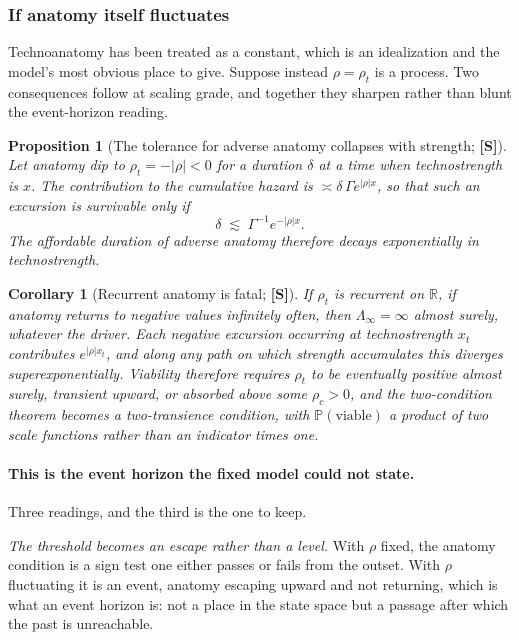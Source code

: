 \documentclass[11pt]{article}
\numberwithin{equation}{section}
\theoremstyle{plain}
\newtheorem{proposition}[theorem]{Proposition}
\newtheorem{corollary}[theorem]{Corollary}
\theoremstyle{definition}
\theoremstyle{remark}
\newcommand{\PP}{\mathbb{P}}
\newcommand{\R}{\mathbb{R}}
\begin{document}
\subsubsection{If anatomy itself fluctuates}\label{gr1:subsub:fluct}

Technoanatomy has been treated as a constant, which is an idealization
and the model's most obvious place to give. Suppose instead
$\rho=\rho_t$ is a process. Two consequences follow at scaling grade,
and together they sharpen rather than blunt the event-horizon reading.

\begin{proposition}[The tolerance for adverse anatomy collapses with
strength; \textbf{[S]}]\label{gr1:prop:tolerance}
Let anatomy dip to $\rho_t=-|\rho|<0$ for a duration $\delta$ at a time
when technostrength is $x$. The contribution to the cumulative hazard
is $\asymp\delta\,\Gamma e^{|\rho|x}$, so that such an excursion is
survivable only if
\begin{equation}\label{gr1:eq:tolerance}
\delta\;\lesssim\;\Gamma^{-1}e^{-|\rho|x}.
\end{equation}
The affordable duration of adverse anatomy therefore decays
\emph{exponentially in technostrength}.
\end{proposition}

\begin{corollary}[Recurrent anatomy is fatal; \textbf{[S]}]
\label{gr1:cor:recurrentanatomy}
If $\rho_t$ is recurrent on $\R$, if anatomy returns to negative
values infinitely often, then $\Lambda_\infty=\infty$ almost surely,
\emph{whatever the driver}. Each negative excursion occurring at
technostrength $x_t$ contributes $e^{|\rho|x_t}$, and along any path on
which strength accumulates this diverges superexponentially. Viability
therefore requires $\rho_t$ to be eventually positive almost surely, transient upward, or absorbed above some $\rho_c>0$, and the
two-condition theorem becomes a \emph{two-transience} condition, with
$\PP(\text{viable})$ a product of two scale functions rather than an
indicator times one.
\end{corollary}

\paragraph{This is the event horizon the fixed model could not
state.}\label{gr1:rem:horizonproper}
Three readings, and the third is the one to keep.

\emph{The threshold becomes an escape rather than a level.} With $\rho$
fixed, the anatomy condition is a sign test one either passes or fails
from the outset. With $\rho$ fluctuating it is an event, anatomy
escaping upward and not returning, which is what an event horizon
is: not a place in the state space but a passage after which the past
is unreachable.
\end{document}
